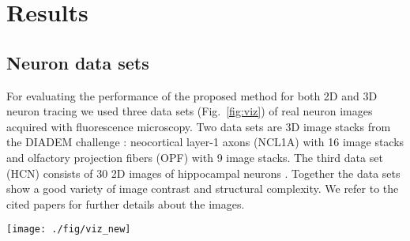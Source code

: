 \documentclass[noinfo,nocrop,final]{bioinfo}
\begin{document}
\section{Results}
\label{sec:results}

\subsection{Neuron data sets} 
\label{subsec:neuron-datasets}
For evaluating the performance of the proposed method for both 2D and 3D neuron tracing we used three data sets (Fig.~\ref{fig:viz}) of real neuron images acquired with fluorescence microscopy. Two data sets are 3D image stacks from the DIADEM challenge \citep{brown2011diadem}: neocortical layer-1 axons (NCL1A) with 16 image stacks and olfactory projection fibers (OPF) with 9 image stacks. The third data set (HCN) consists of 30 2D images of hippocampal neurons \citep{steiner2002overexpression}. Together the data sets show a good variety of image contrast and structural complexity. We refer to the cited papers for further details about the images.

\begin{figure*}[!t]
\centering
\texttt{[image: ./fig/viz\_new]}
\vspace{-1.5\baselineskip}
\caption{Example images with tracing results of the data sets used in the evaluation. Top row: NCL1A image stacks (volume rendered) showing a network of neocortical layer-1 axons. Middle row: OPF image stacks (volume rendered) showing olfactory projection fibers. Bottom row: HCN images showing hippocampal neurons. The tracings (overlaid in red) were obtained with our method using 20 seeds and at most 10 rounds (up to 40 for the top row to capture more detail). For illustration purposes the image intensities are inverted in these visualizations compared to the originals, and the tracings are offset with respect to the neuron structures for better visual comparison.}
\label{fig:viz}
\end{figure*}
\end{document}
